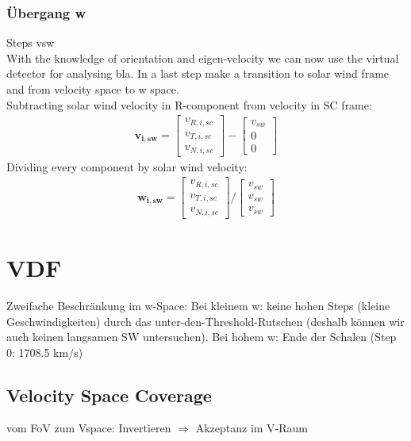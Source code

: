 \subsubsection{Übergang w}
Steps vsw
\\
With the knowledge of orientation and eigen-velocity we can now use the virtual detector for analysing bla. In a last step make a transition to solar wind frame and from velocity space to w space.\\
Subtracting solar wind velocity in R-component from velocity in SC frame: 
\begin{align*}
\mathbf{v_{i,sw}} = \begin{bmatrix}v_{R,i,sc}\\v_{T,i,sc}\\v_{N,i,sc}\end{bmatrix} - \begin{bmatrix}v_{sw}\\0\\0\end{bmatrix}
\end{align*}
Dividing every component by solar wind velocity:
\begin{align*}
\mathbf{w_{i,sw}} = \begin{bmatrix}v_{R,i,sc}\\v_{T,i,sc}\\v_{N,i,sc}\end{bmatrix} / \begin{bmatrix}v_{sw}\\v_{sw}\\v_{sw}\end{bmatrix}
\end{align*}

%
%
%







%
%
%
\section{VDF}
Zweifache Beschränkung im w-Space: Bei kleinem w: keine hohen Steps (kleine Geschwindigkeiten) durch das unter-den-Threshold-Rutschen (deshalb können wir auch keinen langsamen SW untersuchen). Bei hohem w: Ende der Schalen (Step 0: 1708.5 km/s)
%
\subsection{Velocity Space Coverage}
vom FoV zum Vspace: Invertieren $\Rightarrow$ Akzeptanz im V-Raum

